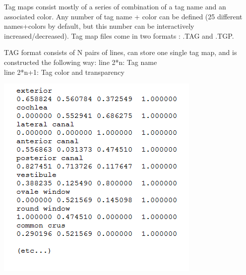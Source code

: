 Tag maps consist mostly of a series of combination of a tag name and an associated color.  Any number of tag name + color can be defined (25 different names+colors by default, but this number can be interactively increased/decreased).
Tag map files come in two formats : .TAG and .TGP.

\begin{minipage}{0.55\textwidth}
TAG format consists of N pairs of lines, can store one single tag map, and is constructed the following way:
line 2*n: Tag name\\
line 2*n+1: Tag color and transparency
\end{minipage}  
 \begin{minipage}{0.45\textwidth}\centering
  \includegraphics[scale=0.5]{images/07/tagmaps/TAG_file.png}
 \end{minipage} 

\noindent

